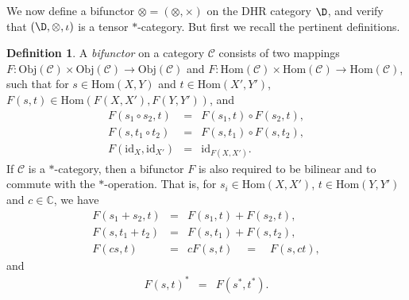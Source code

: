 \documentclass[11pt]{article}
\theoremstyle{definition}
\theoremstyle{definition}
\newtheorem{defn}[thm]{Definition}
\theoremstyle{remark}
\newcommand{\Obj}{\mathrm{Obj}}
\def\2#1{{\mathcal #1}}
\def\7#1{{\mathbb #1}}
\newcommand{\Hom}{\mathrm{Hom}}
\def\id{\mathrm{id}}
\begin{document}
\label{tensor}

We now define a bifunctor $\otimes =(\otimes ,\times )$
on the DHR category $\D$, and verify that $(\D ,\otimes
,\iota )$ is a tensor $*$-category.  But first we
recall the pertinent definitions.

\begin{defn} A \emph{bifunctor} on a category $\2C$
  consists of two mappings $F:\Obj (\2C)\times \Obj
  (\2C )\to \Obj(\2C )$ and $F:\Hom (\2C )\times \Hom
  (\2C )\to \Hom (\2C )$, such that for $s\in \Hom
  (X,Y)$ and $t\in \Hom (X',Y')$, $F(s,t)\in \Hom
  (F(X,X'),F(Y,Y'))$, and
  \begin{eqnarray*} 
    F(s_1\circ s_2,t) & = & F(s_1,t)\circ F(s_2,t),  \\
    F(s,t_1\circ t_2) & = & F(s,t_1)\circ F(s,t_2), \\
    F(\id _X ,\id_{X'}) & = & \id _{F(X,X')} .
\end{eqnarray*} 
If $\2C$ is a $*$-category, then a bifunctor $F$ is
also required to be bilinear and to commute with the
$*$-operation.  That is, for $s_i\in \Hom (X,X')$,
$t\in \Hom (Y,Y')$ and $c\in \7C$, we have
\begin{eqnarray*} 
  F(s_1+s_2,t) &=& F(s_1,t)+F(s_2,t) ,\\
  F(s,t_1+t_2) &=& F(s,t_1)+F(s,t_2) , \\
  F(cs,t) &=& cF(s,t) \quad =\quad F(s,ct) ,
\end{eqnarray*}
and
\begin{eqnarray*}
  F(s,t)^* &=& F(s^*,t^* ) .
\end{eqnarray*}
\end{defn}
\end{document}
